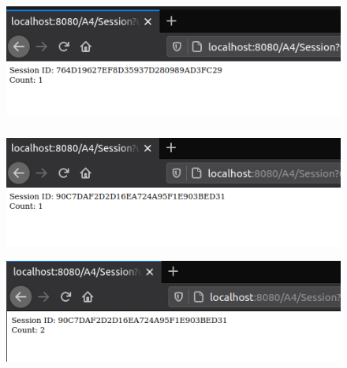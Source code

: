 \documentclass[12pt,letterpaper]{article}
\begin{document}
\subsubsection*{}
\begin{flushleft}

\end{flushleft}

\newpage
\subsection*{}
\begin{figure}[h]
    \centering
    \includegraphics[width = \textwidth]{Pics/firefox1.png}
\end{figure}
\subsubsection*{}
\begin{figure}[h!]
    \centering
    \includegraphics[width = \textwidth]{Pics/firefox2.png}
\end{figure}
\begin{figure}[h!]
    \centering
    \includegraphics[width = \textwidth]{Pics/firefox3.png}
\end{figure}
\newpage
\end{document}
